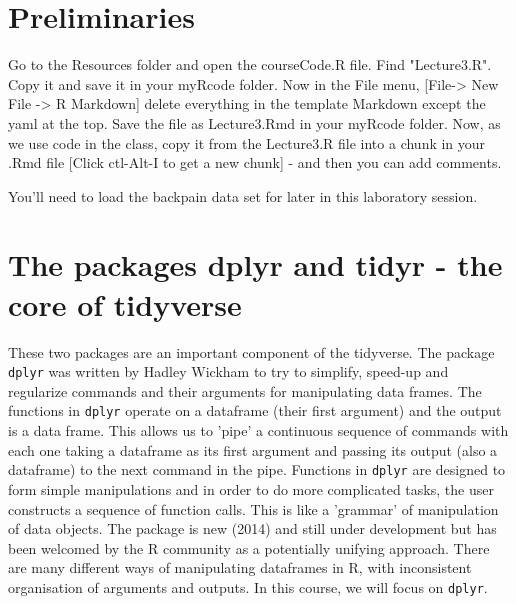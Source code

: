 \documentclass[titlepage]{book}\usepackage{knitr}
\begin{document}
\section{Preliminaries}
Go to the Resources folder and open the courseCode.R file.  Find "Lecture3.R". Copy it and save it in your myRcode folder. Now in the File menu, [File-> New File -> R Markdown] delete everything in the template Markdown except the yaml at the top.  Save the file as Lecture3.Rmd in your myRcode folder.
Now, as we use code in the class, copy it from the Lecture3.R file into a chunk in your .Rmd file [Click ctl-Alt-I to get a new chunk] -  and then you can add comments.

You'll need to load the backpain data set for later in this laboratory session.
\begin{knitrout}
\color{fgcolor}
\end{knitrout}

\section{The packages dplyr and tidyr - the core of tidyverse}

These two packages are an important component of the tidyverse. The package \texttt{dplyr} was written by Hadley Wickham to try to simplify, speed-up and regularize commands and their arguments for manipulating data frames. The functions in \texttt{dplyr} operate on a dataframe (their first argument) and the output is a data frame. This allows us to 'pipe' a continuous sequence of commands with each one taking a dataframe as its first argument and passing its output (also a dataframe) to the next command in the pipe.
Functions in \texttt{dplyr} are designed to form simple manipulations and in order to do more complicated tasks, the user constructs a sequence of function calls. This is like a 'grammar' of manipulation of data objects. The package is new (2014) and still under development but has been welcomed by the R community as a potentially unifying approach. There are many different ways of manipulating dataframes in R, with inconsistent organisation of arguments and outputs. In this course, we will focus on \texttt{dplyr}. 
\end{document}
